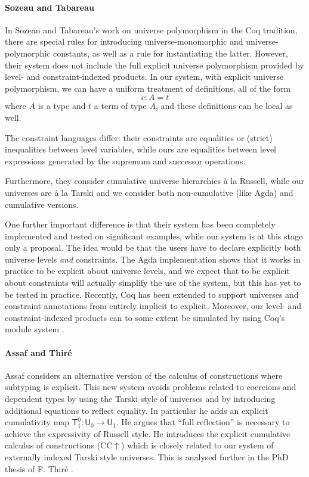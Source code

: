 \documentclass[a4paper,UKenglish,cleveref, autoref, thm-restate]{lipics-v2021}
\newcommand{\UU}{\mathsf{U}}
\newcommand{\T}{\mathsf{T}}
\begin{document}
\paragraph*{Sozeau and Tabareau}

In Sozeau and Tabareau's \cite{SozeauTabareau:coq} work on universe polymorphism in the Coq tradition, there are special rules for introducing universe-monomorphic and universe-polymorphic constants, as well as a rule for instantiating the latter.
However, their system does not include the full explicit universe polymorphism provided by level- and constraint-indexed products.
In our system, with explicit universe polymorphism, we can have a uniform treatment of definitions, all of the form
$$ c : A = t$$
where $A$ is a type and $t$ a term of type $A$, and these definitions can be local as well.

The constraint languages differ: their constraints are equalities or (strict) inequalities between level variables, while ours are equalities between level expressions generated by the supremum and successor operations.

Furthermore, they consider cumulative universe hierarchies  \`a la Russell,
while our universes are \`a la Tarski and we consider both non-cumulative
(like Agda) and cumulative versions.

One further important difference is that their system has been completely implemented and tested on
significant examples, while our system is at this stage only a proposal. The idea would be that the
users have to declare explicitly both universe levels {\em and} constraints. The Agda implementation
shows that it works in practice to be explicit about universe levels, and we expect that to be
explicit about constraints will actually simplify the use of the system,
but this has yet to be tested in practice.
Recently, Coq has been extended to support universes and constraint
annotations from entirely implicit to explicit. Moreover, our level- and
constraint-indexed products can to some extent be simulated by using
Coq's module system \cite{coq:univpoly}.

\paragraph*{Assaf and Thir\'e}

Assaf \cite{Assaf14} considers an alternative version of the calculus of
constructions where subtyping is explicit. This new system avoids problems related to coercions and dependent types by using the Tarski style
of universes and by introducing additional equations to reflect equality. In particular he adds an explicit cumulativity map $\T^0_1 : \UU_0 \to \UU_1$. He argues that ``full reflection'' is necessary to achieve the expressivity of Russell style. He introduces the explicit cumulative calculus of constructions (CC$\uparrow$) which is closely related to our system of externally indexed Tarski style universes.
This is analysed further in the PhD thesis of F. Thir\'e \cite{Thire20}.
\end{document}
